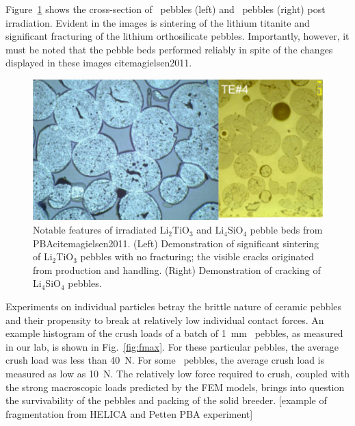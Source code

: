 Figure~\ref{fig:pba} shows the cross-section of \lit~pebbles (left) and \lis~pebbles (right) post irradiation. Evident in the images is sintering of the lithium titanite and significant fracturing of the lithium orthosilicate pebbles. Importantly, however, it must be noted that the pebble beds performed reliably in spite of the changes displayed in these images cite{magielsen2011}. 


\begin{figure}[t!]
\centering
\includegraphics[width=\singleimagewidth]{figures/Fig-10}
\caption{Notable features of irradiated Li$_2$TiO$_3$ and Li$_4$SiO$_4$ pebble beds from PBAcite{magielsen2011}. (Left) Demonstration of significant sintering of Li$_2$TiO$_3$ pebbles with no fracturing; the visible cracks originated from production and handling. (Right) Demonstration of cracking of Li$_4$SiO$_4$ pebbles.}
\label{fig:pba}
\end{figure}


Experiments on individual particles betray the brittle nature of ceramic pebbles and their propensity to break at relatively low individual contact forces. An example histogram of the crush loads of a batch of 1~mm \lit~pebbles, as measured in our lab, is shown in Fig.~\ref{fig:fmax}. For these particular pebbles, the average crush load was less than \SI{40}{\newton}. For some \lis~pebbles, the average crush load is measured as low as \SI{10}{\newton}. The relatively low force required to crush, coupled with the strong macroscopic loads predicted by the FEM models, brings into question the survivability of the pebbles and packing of the solid breeder. [example of fragmentation from HELICA and Petten PBA experiment]

